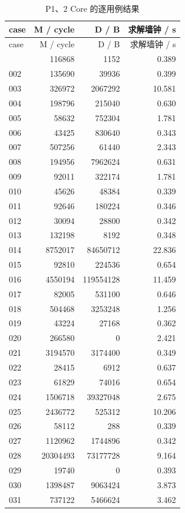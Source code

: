 \documentclass[anonymous,notoc]{gmcm2026}
\begin{document}
\begin{longtable}{lrrr}
\caption{P1、2 Core 的逐用例结果}\\
\toprule
case & M / cycle & D / B & 求解墙钟 / s\\\midrule
\endfirsthead
\toprule
case & M / cycle & D / B & 求解墙钟 / s\\\midrule
\endhead
\bottomrule\endfoot
001 & 116868 & 1152 & 0.389 \\
002 & 135690 & 39936 & 0.399 \\
003 & 326972 & 2067292 & 10.581 \\
004 & 198796 & 215040 & 0.630 \\
005 & 58632 & 752304 & 1.781 \\
006 & 43425 & 830640 & 0.343 \\
007 & 507256 & 61440 & 2.343 \\
008 & 194956 & 7962624 & 0.631 \\
009 & 92011 & 322174 & 1.781 \\
010 & 45626 & 48384 & 0.339 \\
011 & 92646 & 180224 & 0.346 \\
012 & 30094 & 28800 & 0.342 \\
013 & 132198 & 8192 & 0.348 \\
014 & 8752017 & 84650712 & 22.836 \\
015 & 92810 & 224536 & 0.654 \\
016 & 4550194 & 119554128 & 11.459 \\
017 & 82005 & 531100 & 0.646 \\
018 & 504468 & 3253248 & 1.256 \\
019 & 43224 & 27168 & 0.362 \\
020 & 266580 & 0 & 2.421 \\
021 & 3194570 & 3174400 & 0.349 \\
022 & 28415 & 6912 & 0.637 \\
023 & 61829 & 74016 & 0.654 \\
024 & 1506718 & 39327048 & 2.675 \\
025 & 2436772 & 525312 & 10.206 \\
026 & 58112 & 288 & 0.339 \\
027 & 1120962 & 1744896 & 0.342 \\
028 & 20304493 & 73177728 & 9.164 \\
029 & 19740 & 0 & 0.393 \\
030 & 1398487 & 9063424 & 3.873 \\
031 & 737122 & 5466624 & 3.462 \\

\end{longtable}
\end{document}
